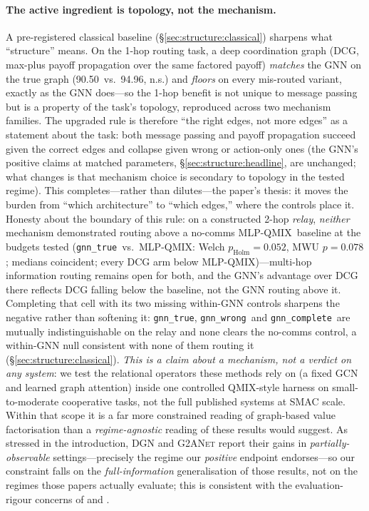 \documentclass[10pt]{article}
\makeatletter
\newcommand{\algoname}[1]{\textsc{#1}}
\newcommand{\mlpqmix}{\algoname{MLP-QMIX}}
\newcommand{\gtrue}{\texttt{gnn\_true}}
\newcommand{\gwrong}{\texttt{gnn\_wrong}}
\newcommand{\gcomplete}{\texttt{gnn\_complete}}
\newcommand{\SCkTrue}{94.96}          %
\newcommand{\CBBdcgtrue}{90.50}        %
\makeatother
\begin{document}
\paragraph{The active ingredient is topology, not the mechanism.} A
pre-registered classical baseline (\S\ref{sec:structure:classical}) sharpens
what ``structure'' means. On the 1-hop routing task, a deep coordination graph
(\algoname{DCG}, max-plus payoff propagation over the same factored payoff)
\emph{matches} the GNN on the true graph (\CBBdcgtrue\ vs.\ \SCkTrue, n.s.) and
\emph{floors} on every mis-routed variant, exactly as the GNN does---so the
1-hop benefit is not unique to message passing but is a property of the task's
topology, reproduced across two mechanism families. The upgraded rule is
therefore ``the right edges, not more edges'' as a statement about the task:
both message passing and payoff propagation succeed given the correct edges and
collapse given wrong or action-only ones (the GNN's positive claims at matched
parameters, \S\ref{sec:structure:headline}, are unchanged; what changes is that
mechanism choice is secondary to topology in the tested regime). This
completes---rather than dilutes---the paper's thesis: it moves the burden from
``which architecture'' to ``which edges,'' where the controls place it.
Honesty about the boundary of this rule: on a constructed 2-hop \emph{relay},
\emph{neither} mechanism demonstrated routing above a no-comms \mlpqmix\
baseline at the budgets tested (\gtrue\ vs.\ \mlpqmix: Welch
$p_{\text{Holm}}{=}0.052$, MWU $p{=}0.078$; medians coincident; every DCG arm
below \mlpqmix)---multi-hop information routing remains open for both, and the
GNN's advantage over DCG there reflects DCG falling below the baseline, not the
GNN routing above it. Completing that cell with its two missing within-GNN
controls sharpens the negative rather than softening it: \gtrue, \gwrong\ and
\gcomplete\ are mutually indistinguishable on the relay and none clears the
no-comms control, a within-GNN null consistent with none of them routing it
(\S\ref{sec:structure:classical}).
\emph{This is a claim about a mechanism, not a verdict on any system}: we
test the relational operators these methods rely on (a fixed GCN and learned
graph attention) inside one controlled QMIX-style harness on
small-to-moderate cooperative tasks, not the full published systems at SMAC
scale. Within that scope it is a far more constrained reading of graph-based
value factorisation than a
\emph{regime-agnostic} reading of these results
\citep{jiang_2020_dgn,liu_2020_g2anet,naderializadeh_2020_graphmix}
would suggest. As stressed in the introduction, \algoname{DGN} and
\algoname{G2ANet} report their gains in \emph{partially-observable}
settings---precisely
the regime our \emph{positive} endpoint endorses---so our constraint falls on
the \emph{full-information} generalisation of those results, not on the
regimes those papers actually evaluate; this is consistent with the
evaluation-rigour concerns of
\citet{henderson_2018_drlmatters} and \citet{agarwal_2021_precipice}.
\end{document}
